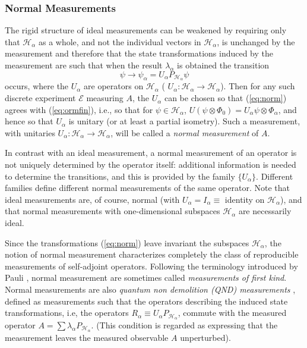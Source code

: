\documentclass[12pt]{article}
\newcommand{\eq}[1]{(\ref{#1})}
\newcommand{\sa}{self-adjoint}
\renewcommand{\a}{\alpha}
\newcommand{\la}{\lambda_{\a}}
\newcommand{\psia}{\psi_{\a}}
\newcommand{\Ha}{{\H}_{\a}}
\renewcommand{\H}{\mbox{$\mathcal{H}$}}
\newcommand{\Pa}{ P_{ {\mathcal{H}_{\a} } } }
\newcommand{\Aa}{R_{\a}}
\newcommand{\E}{\mbox{$\mathscr{E}$}}
\begin{document}
\subsubsection{Normal Measurements}
\label{sec:NM}
The rigid structure of ideal measurements can be weakened by requiring
only that $\Ha$ as a whole, and not the individual vectors in $\Ha$,
is unchanged by the measurement and therefore that the state
transformations induced by the measurement are such that when the
result $\la$ is obtained the transition
\begin{equation}
\psi \to\psia = U_\a \Pa \psi
\label{eq:norm}
\end{equation}
occurs, where the $U_\a$ are operators on $\Ha$ ( $U_\a :\Ha\to\Ha$).
Then for any such discrete experiment \E{} measuring $A$, the $U_\a$
can be chosen so that \eq{eq:norm} agrees with \eq{eq:ormfin}, i.e.,
so that for $\psi \in \Ha$, $U(\psi\otimes\Phi_0) =
U_\a\psi\otimes\Phi_\a$, and hence so that $U_\a$ is unitary (or at
least a partial isometry). Such a measurement, with unitaries $U_\a
:\Ha\to\Ha$, will be called a \emph{normal measurement} of $A$.

In contrast with an ideal measurement, a normal measurement of an
operator is not uniquely determined by the operator itself: additional
information is needed to determine the transitions, and this is
provided by the family $\{U_{\a}\}$.  Different families define
different normal measurements of the same operator.  Note that ideal
measurements are, of course, normal (with $U_{\a}= I_{\a} \equiv$
identity on $\Ha$), and that normal measurements with one-dimensional
subspaces $\Ha$ are necessarily ideal.

Since the transformations (\ref{eq:norm}) leave invariant the
subspaces $\Ha$, the notion of normal measurement characterizes
completely the class of reproducible measurements of \sa{} operators.
Following the terminology introduced by Pauli \cite{Pau58}, normal
measurement are sometimes called {\it measurements of first kind\/}.
Normal measurements are also \emph{quantum non demolition (QND)
   measurements\/} \cite{Brag}, defined as measurements such that the
operators describing the induced state transformations, i.e, the
operators $\Aa\equiv U_{\a}\Pa$, commute with the measured operator
$A=\sum\la\Pa$. (This condition is regarded as expressing that the
measurement leaves the measured observable $A$ unperturbed).
\end{document}
